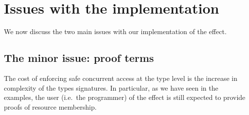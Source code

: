 \section{Issues with the implementation}

We now discuss the two main issues with our implementation of the
 effect.

\subsection{The minor issue: proof terms}

The cost of enforcing safe concurrent access at the type level is the increase
in complexity of the types signatures. In particular, as we have seen in the
examples, the user (i.e.~the programmer) of the effect is still expected to
provide proofs of resource membership.

